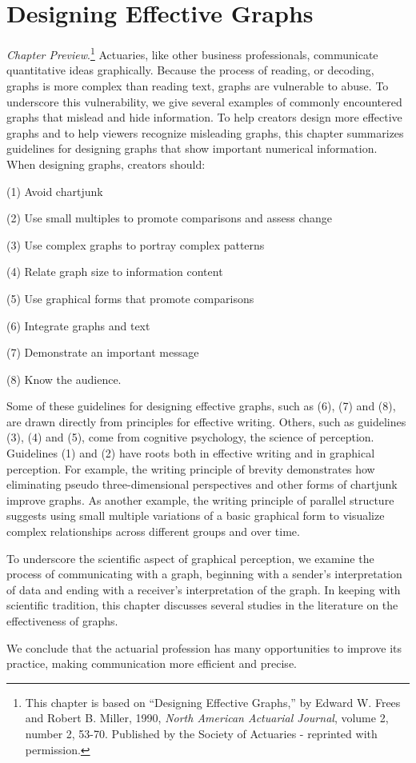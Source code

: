\setcounter{chapter}{20}

\chapter{Designing Effective Graphs}\label{c21:ChapGraphs}

{\small \textit{Chapter Preview}.\footnote{This chapter is based on
``Designing Effective Graphs,'' by Edward W. Frees and Robert B.
Miller, 1990, \textit{North American Actuarial Journal}, volume 2,
number 2, 53-70. Published by the Society of Actuaries - reprinted
with permission.} Actuaries, like other business professionals,
communicate quantitative ideas graphically. Because the process of
reading, or decoding, graphs is more complex than reading text,
graphs are vulnerable to abuse. To underscore this vulnerability, we
give several examples of commonly encountered graphs that mislead
and hide information. To help creators design more effective graphs
and to help viewers recognize misleading graphs, this chapter
summarizes guidelines for designing graphs that show important
numerical information. When designing graphs, creators should:

(1) Avoid chartjunk

(2) Use small multiples to promote comparisons and assess change

(3) Use complex graphs to portray complex patterns

(4) Relate graph size to information content

(5) Use graphical forms that promote comparisons

(6) Integrate graphs and text

(7) Demonstrate an important message

(8) Know the audience.

Some of these guidelines for designing effective graphs, such as
(6), (7) and (8), are drawn directly from principles for effective
writing. Others, such as guidelines (3), (4) and (5), come from
cognitive psychology, the science of perception. Guidelines (1) and
(2) have roots both in effective writing and in graphical
perception. For example, the writing principle of brevity
demonstrates how eliminating pseudo three-dimensional perspectives
and other forms of chartjunk improve graphs. As another example, the
writing principle of parallel structure suggests using small
multiple variations of a basic graphical form to visualize complex
relationships across different groups and over time.


To underscore the scientific aspect of graphical perception, we
examine the process of communicating with a graph, beginning with a
sender's interpretation of data and ending with a receiver's
interpretation of the graph. In keeping with scientific tradition,
this chapter discusses several studies in the literature on the
effectiveness of graphs.

We conclude that the actuarial profession has many opportunities to
improve its practice, making communication more efficient and
precise.}


